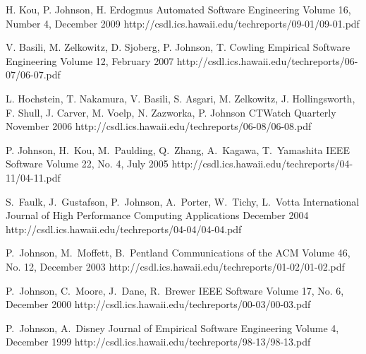 \documentclass[11pt,letterpaper,sans]{moderncv} %
\begin{document}
          {H. Kou, P. Johnson, H. Erdogmus}
          {Automated Software Engineering}
          {Volume 16, Number 4, December 2009}
          {http://csdl.ics.hawaii.edu/techreports/09-01/09-01.pdf}

          {V. Basili, M. Zelkowitz, D. Sjoberg, P. Johnson, T. Cowling}
          {Empirical Software Engineering}
          {Volume 12, February 2007}
          {http://csdl.ics.hawaii.edu/techreports/06-07/06-07.pdf}

          {L. Hochstein, T. Nakamura, V. Basili, S. Asgari, M. Zelkowitz, J. Hollingsworth, F. Shull, J. Carver, M. Voelp, N. Zazworka, P. Johnson}
          {CTWatch Quarterly}
          {November 2006}
          {http://csdl.ics.hawaii.edu/techreports/06-08/06-08.pdf}

          {P. Johnson, H.~Kou, M.~Paulding, Q.~Zhang, A.~Kagawa, T.~Yamashita}
          {IEEE Software}
          {Volume 22, No. 4, July 2005}
          {http://csdl.ics.hawaii.edu/techreports/04-11/04-11.pdf}

          {S.~Faulk, J.~Gustafson, P.~Johnson, A.~Porter, W.~Tichy, L.~Votta}
          {International Journal of High Performance Computing Applications}
          {December 2004}
          {http://csdl.ics.hawaii.edu/techreports/04-04/04-04.pdf}

          {P.~Johnson, M.~Moffett, B.~Pentland}
          {Communications of the ACM}
          {Volume 46, No. 12, December 2003}
          {http://csdl.ics.hawaii.edu/techreports/01-02/01-02.pdf}

          {P.~Johnson, C.~Moore, J.~Dane, R.~Brewer}
          {IEEE Software}
          {Volume 17, No. 6, December 2000}
          {http://csdl.ics.hawaii.edu/techreports/00-03/00-03.pdf}

          {P.~Johnson, A.~Disney}
          {Journal of Empirical Software Engineering}
          {Volume 4, December 1999}
          {http://csdl.ics.hawaii.edu/techreports/98-13/98-13.pdf}
\end{document}
